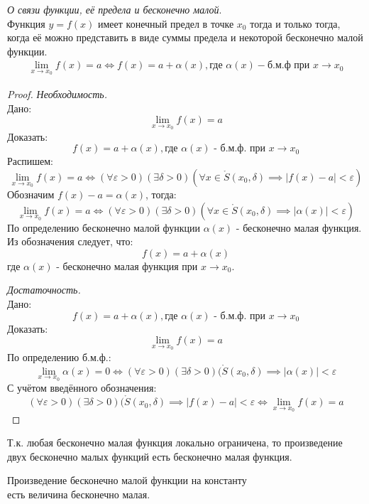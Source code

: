 \begin{theorem}
  \textit{О связи функции, её предела и бесконечно малой}. \\
  Функция $y = f(x)$ имеет конечный предел в точке  $x_0$ тогда и только тогда, когда её можно представить в виде суммы предела и некоторой бесконечно малой функции.
  \begin{gather*}
    \lim_{x \to x_0} f(x) = a \iff f(x) = a + \alpha(x), \text{где } \alpha(x) - \text{б.м.ф при } x \to x_0
  \end{gather*}
\end{theorem}
\begin{proof}
  \textit{Необходимость.} \\
  Дано: \[
    \lim_{x \to x_0} f(x) = a
  \]
  Доказать: \[
    f(x) = a + \alpha(x), \text{где } \alpha(x) \text{ - б.м.ф. при } x \to  x_0
  \]
  Распишем: \[
    \lim_{x \to x_0} f(x) = a \iff (\forall \varepsilon > 0)(\exists \delta > 0)(\forall x \in \mathring{S}(x_0, \delta) \implies |f(x) - a| < \varepsilon)  
  \]
  Обозначим $f(x) - a = \alpha(x)$, тогда: \[
    \lim_{x \to x_0} f(x) = a \iff (\forall \varepsilon > 0)(\exists \delta > 0)(\forall x \in \mathring{S}(x_0, \delta) \implies |\alpha(x)| < \varepsilon)  
  \]
  По определению бесконечно малой функции $\alpha(x)$ - бесконечно малая функция. Из обозначения следует, что: \[
    f(x) = a + \alpha(x)
  \]
  где $\alpha(x)$ - бесконечно малая функция при $x \to x_0$.

  \textit{Достаточность.} \\
  Дано: \[
    f(x) = a + \alpha(x), \text{где } \alpha(x) \text{ - б.м.ф. при } x \to x_0
  \]
  Доказать: \[
    \lim_{x \to x_0} f(x) = a
  \]
  По определению б.м.ф.: \[
    \lim_{x \to x_0} \alpha(x) = 0 \iff (\forall \varepsilon > 0)(\exists \delta > 0)(\mathring{S}(x_0, \delta) \implies |\alpha(x)| < \varepsilon 
  \]
  С учётом введённого обозначения: \[
    (\forall \varepsilon > 0)(\exists \delta > 0)(\mathring{S}(x_0, \delta) \implies |f(x) - a| < \varepsilon \iff \lim_{x \to x_0} f(x) = a
  \]
\end{proof}
\begin{corollary}
  Т.к. любая бесконечно малая функция локально ограничена, то произведение двух бесконечно малых функций есть бесконечно малая функция.
\end{corollary}
\begin{corollary}
  Произведение бесконечно малой функции на константу \\ есть величина бесконечно малая.
\end{corollary}

